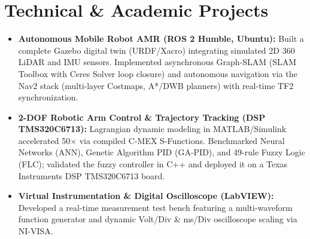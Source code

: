 \documentclass[10pt, a4paper]{article}
\begin{document}
\section*{Technical \& Academic Projects}
\begin{itemize}[leftmargin=*, itemsep=0.4ex, parsep=0pt]
	\item {\color{primary}\textbf{Autonomous Mobile Robot AMR (ROS 2 Humble, Ubuntu):}}
	      Built a complete Gazebo digital twin (URDF/Xacro) integrating simulated 2D 360\textdegree{} LiDAR and IMU sensors. Implemented asynchronous Graph-SLAM (SLAM Toolbox with Ceres Solver loop closure) and autonomous navigation via the Nav2 stack (multi-layer Costmaps, A*/DWB planners) with real-time TF2 synchronization.
	\item {\color{primary}\textbf{2-DOF Robotic Arm Control \& Trajectory Tracking (DSP TMS320C6713):}}
	      Lagrangian dynamic modeling in MATLAB/Simulink accelerated 50$\times$ via compiled C-MEX S-Functions. Benchmarked Neural Networks (ANN), Genetic Algorithm PID (GA-PID), and 49-rule Fuzzy Logic (FLC); validated the fuzzy controller in C++ and deployed it on a Texas Instruments DSP TMS320C6713 board.
	\item {\color{primary}\textbf{Virtual Instrumentation \& Digital Oscilloscope (LabVIEW):}}
	      Developed a real-time measurement test bench featuring a multi-waveform function generator and dynamic Volt/Div \& ms/Div oscilloscope scaling via NI-VISA.
\end{itemize}

\end{document}
